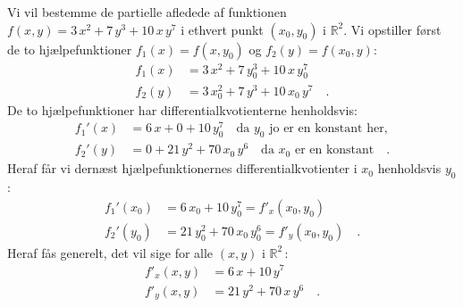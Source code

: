 \begin{example}
Vi vil bestemme de partielle afledede af funktionen $f(x,y) = 3\,x^{2} + 7\,y^{3} + 10\,x\,y^{7}$ i ethvert punkt $(x_{0}, y_{0})$ i $\mathbb{R}^{2}$. Vi opstiller først de to hjælpefunktioner $f_{1}(x) = f(x, y_{0})$ og $f_{2}(y) = f(x_{0}, y)$:
\begin{equation}
\begin{aligned}
f_{1}(x) &= 3\,x^{2} + 7\,y_{0}^{3} + 10\,x\,y_{0}^{7} \\
f_{2}(y) &= 3\,x_{0}^{2} + 7\,y^{3} + 10\,x_{0}\,y^{7} \quad.
\end{aligned}
\end{equation}
De to hjælpefunktioner har differentialkvotienterne henholdsvis:
\begin{equation}
\begin{aligned}
f_{1}'(x) &= 6\,x + 0 + 10\,y_{0}^{7} \quad \textrm{da $y_{0}$ jo er en konstant her,} \\
f_{2}'(y) &= 0 + 21\,y^{2} + 70\,x_{0}\,y^{6} \quad \textrm{da $x_{0}$ er en konstant} \quad.
\end{aligned}
\end{equation}
Heraf får vi dernæst hjælpefunktionernes differentialkvotienter i $x_{0}$ henholdsvis $y_{0}$:
\begin{equation}
\begin{aligned}
f_{1}'(x_{0}) &= 6\,x_{0} +  10\,y_{0}^{7}  = f'_{x}(x_{0}, y_{0})\\
f_{2}'(y_{0}) &= 21\,y_{0}^{2} + 70\,x_{0}\,y_{0}^{6} = f'_{y}(x_{0}, y_{0})  \quad.
\end{aligned}
\end{equation}
Heraf fås generelt, det vil sige for alle $(x,y)$ i $\mathbb{R}^{2}\,$:
\begin{equation}
\begin{aligned}
f'_{x}(x,y) &= 6\,x +  10\,y^{7}  \\
f'_{y}(x,y) &= 21\,y^{2} + 70\,x\,y^{6} \quad.
\end{aligned}
\end{equation}
\end{example}

